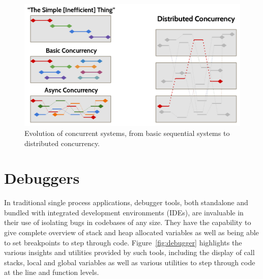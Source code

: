 \documentclass[12pt,pdftex,titlepage]{report}
\begin{document}
            \begin{figure}[htb!]
                \centering
                \includegraphics[scale=1.1]{concurrency.png}
                \caption[Evolution of concurrent systems]{Evolution of concurrent systems, from basic sequential systems to distributed concurrency.}
                \label{fig:concurrency}
            \end{figure}
        
        \section{Debuggers}
            In traditional single process applications, debugger tools, both standalone and bundled with integrated development environments (IDEs), are invaluable in their
            use of isolating bugs in codebases of any size. They have the capability to give complete overview of stack and heap allocated variables as well as being able to set
            breakpoints to step through code. Figure~\ref{fig:debugger} highlights the various insights and utilities provided by such tools, including the display of call stacks,
            local and global variables as well as various utilities to step through code at the line and function levels.
\end{document}
